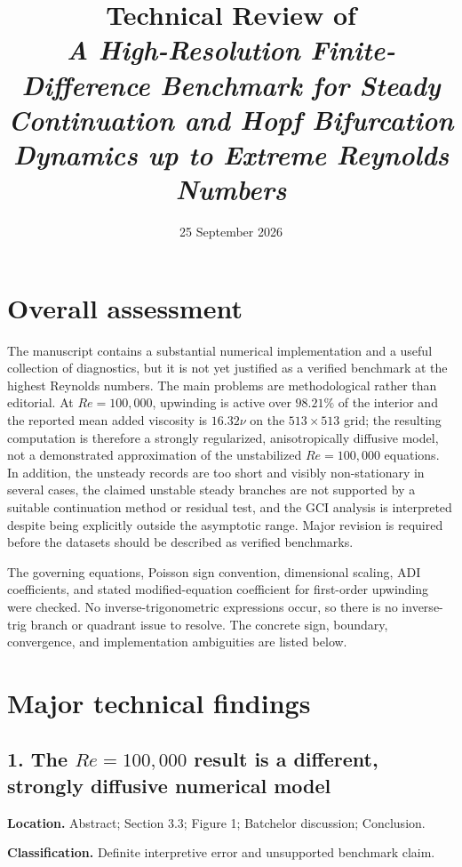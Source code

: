 \documentclass[11pt]{article}
\title{Technical Review of\\
\emph{A High-Resolution Finite-Difference Benchmark for Steady Continuation and Hopf Bifurcation Dynamics up to Extreme Reynolds Numbers}}
\author{}
\date{25 September 2026}
\newcommand{\Rey}{\mathit{Re}}
\begin{document}
\maketitle

\section*{Overall assessment}

The manuscript contains a substantial numerical implementation and a useful collection of diagnostics, but it is not yet justified as a verified benchmark at the highest Reynolds numbers. The main problems are methodological rather than editorial. At $\Rey=100{,}000$, upwinding is active over $98.21\%$ of the interior and the reported mean added viscosity is $16.32\nu$ on the $513\times513$ grid; the resulting computation is therefore a strongly regularized, anisotropically diffusive model, not a demonstrated approximation of the unstabilized $\Rey=100{,}000$ equations. In addition, the unsteady records are too short and visibly non-stationary in several cases, the claimed unstable steady branches are not supported by a suitable continuation method or residual test, and the GCI analysis is interpreted despite being explicitly outside the asymptotic range. Major revision is required before the datasets should be described as verified benchmarks.

The governing equations, Poisson sign convention, dimensional scaling, ADI coefficients, and stated modified-equation coefficient for first-order upwinding were checked. No inverse-trigonometric expressions occur, so there is no inverse-trig branch or quadrant issue to resolve. The concrete sign, boundary, convergence, and implementation ambiguities are listed below.

\section*{Major technical findings}

\subsection*{1. The $\Rey=100{,}000$ result is a different, strongly diffusive numerical model}

\textbf{Location.} Abstract; Section 3.3; Figure 1; Batchelor discussion; Conclusion.

\textbf{Classification.} Definite interpretive error and unsupported benchmark claim.
\end{document}
